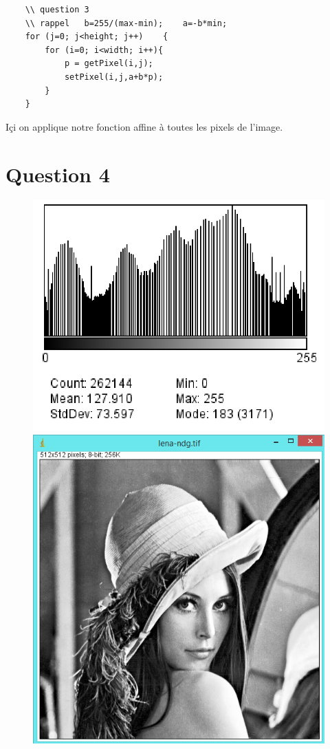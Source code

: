 \documentclass[a4paper,12pt]{report}
\begin{document}
\begin{lstlisting}
	\\ question 3	
	\\ rappel 	b=255/(max-min); 	a=-b*min;
	for (j=0; j<height; j++)	{
		for (i=0; i<width; i++){
			p = getPixel(i,j);
			setPixel(i,j,a+b*p);
		}
	}
\end{lstlisting}

Içi on applique notre fonction affine à toutes les pixels de l'image.

\newpage
	
\section*{Question 4}


\begin{figure}[!ht]
	\center
	\includegraphics[scale=0.4]{image/histo_egalise.png}
	\includegraphics[scale=0.4]{image/image_q4.png}
\end{figure}
\end{document}

